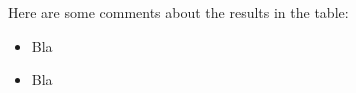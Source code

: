 \documentclass{article}
\begin{document}
Here are some comments about the results in the table:
\begin{itemize}
  \item Bla
  \item Bla
\end{itemize}


\small
\medskip









\end{document}
